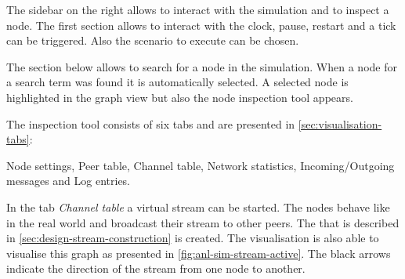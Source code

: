 The sidebar on the right allows to interact with the simulation and to inspect a node. The first section allows to interact with the clock, pause, restart and a tick can be triggered. Also the scenario to execute can be chosen.

The section below allows to search for a node in the simulation. When a node for a search term was found it is automatically selected. A selected node is highlighted in the graph view but also the node inspection tool appears.

The inspection tool consists of six tabs and are presented in \vref{sec:visualisation-tabs}: 

Node settings, Peer table, Channel table, Network statistics, Incoming/Outgoing messages and Log entries. 

In the tab \textit{Channel table} a virtual stream can be started. The nodes behave like in the real world and broadcast their stream to other peers. The  that is described in \vref{sec:design-stream-construction} is created. The visualisation is also able to visualise this graph as presented in \vref{fig:anl-sim-stream-active}. The black arrows indicate the direction of the stream from one node to another.

